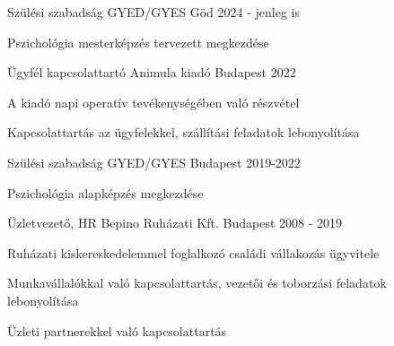 

\begin{cventries}

  \cventry
  {Szülési szabadság} %
  {GYED/GYES} %
  {Göd} %
  {2024 - jenleg is} %
  {
    \begin{cvitems} %
      \item {Pszichológia mesterképzés tervezett megkezdése}
    \end{cvitems}
  }

  \cventry
  {Ügyfél kapcsolattartó} %
  {Animula kiadó} %
  {Budapest} %
  {2022} %
  {
    \begin{cvitems} %
      \item {A kiadó napi operatív tevékenységében való részvétel}
      \item {Kapcsolattartás az ügyfelekkel, szállítási feladatok lebonyolítása}
    \end{cvitems}
  }

   \cventry
  {Szülési szabadság} %
  {GYED/GYES} %
  {Budapest} %
  {2019-2022} %
  {
    \begin{cvitems} %
      \item {Pszichológia alapképzés megkezdése}
    \end{cvitems}
  }


  \cventry
    {Üzletvezető, HR} %
    {Bepino Ruházati Kft.} %
    {Budapest} %
    {2008 - 2019} %
    {
      \begin{cvitems} %
        \item {Ruházati kiskereskedelemmel foglalkozó családi vállakozás ügyvitele}
        \item {Munkavállalókkal való kapcsolattartás, vezetői és toborzási feladatok lebonyolítása}
        \item {Üzleti partnerekkel való kapcsolattartás}
      \end{cvitems}
    }

\end{cventries}
